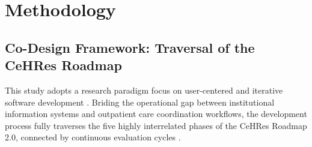 \documentclass[manuscript, screen, review]{acmart}
\begin{document}
\section{Methodology}
\label{sec:methodology}

\subsection{Co-Design Framework: Traversal of the CeHRes Roadmap}
\label{sub:cehres_traversal}
This study adopts a research paradigm focus on user-centered and iterative software development \cite{lewis2012usability,shore2021art}. Briding the operational gap between institutional information systems and outpatient care coordination workflows, the development process fully traverses the five highly interrelated phases of the CeHRes Roadmap 2.0, connected by continuous evaluation cycles \cite{Kip2025CeHRes}. 
\end{document}
